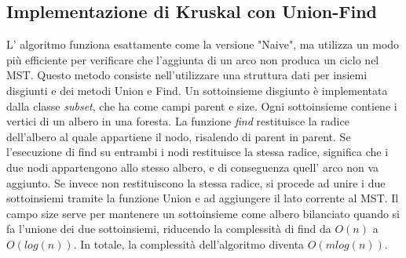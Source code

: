 \subsection{Implementazione di Kruskal con Union-Find}
L' algoritmo funziona esattamente come la versione "Naive", ma utilizza un modo più efficiente per verificare
che l'aggiunta di un arco non produca un ciclo nel MST. Questo metodo consiste nell'utilizzare una struttura dati per insiemi disgiunti e dei metodi Union e Find. Un sottoinsieme disgiunto è implementata dalla classe \textit{subset}, che
ha come campi parent e size. Ogni sottoinsieme contiene i vertici di un albero in una foresta. La funzione \textit{find} restituisce la radice dell'albero al quale appartiene il nodo, risalendo di parent in parent. Se l'esecuzione di find su entrambi i nodi restituisce la stessa radice,
significa che i due nodi appartengono  allo stesso albero, e di conseguenza quell' arco non va aggiunto. Se invece non restituiscono la stessa radice, si procede ad unire i due sottoinsiemi tramite la funzione Union
e ad aggiungere il lato corrente al MST. Il campo size serve per mantenere un sottoinsieme come albero bilanciato quando si fa l'unione dei due sottoinsiemi, riducendo la complessità di find da $O(n)$ a $O(log(n))$. In totale, la complessità dell'algoritmo diventa $O(m log(n))$.